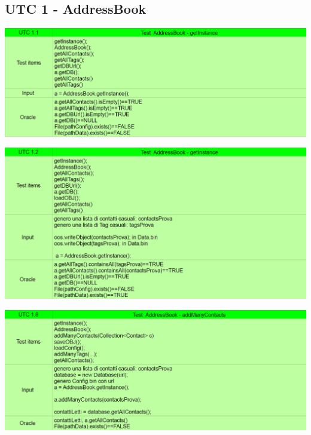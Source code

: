 \subsection{UTC 1 - AddressBook}
\begin{center} \includegraphics[width=\linewidth]{images/UTC/1-1.png} \end{center}
\begin{center} \includegraphics[width=\linewidth]{images/UTC/1-2.png} \end{center}
\begin{center} \includegraphics[width=\linewidth]{images/UTC/1-8.png} \end{center}
